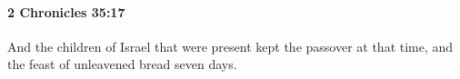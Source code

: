 
		\paragraph{2 Chronicles 35:17} %
			\label{2CHRONICLES-35-17}

			And the children of Israel that were present kept the passover at that time, and the feast of unleavened bread seven days.


